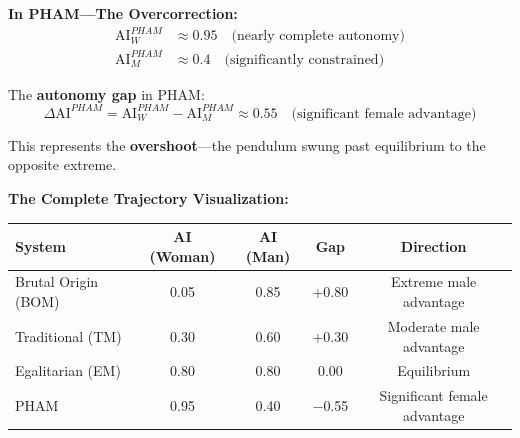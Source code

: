 \documentclass[12pt, letterpaper]{article}
\begin{document}
\textbf{In PHAM---The Overcorrection:}
\begin{align*}
\text{AI}_W^{PHAM} &\approx 0.95 \quad \text{(nearly complete autonomy)} \\
\text{AI}_M^{PHAM} &\approx 0.4 \quad \text{(significantly constrained)}
\end{align*}

The \textbf{autonomy gap} in PHAM:
\[
\Delta \text{AI}^{PHAM} = \text{AI}_W^{PHAM} - \text{AI}_M^{PHAM} \approx 0.55 \quad \text{(significant female advantage)}
\]

This represents the \textbf{overshoot}---the pendulum swung past equilibrium to the opposite extreme.

\textbf{The Complete Trajectory Visualization:}

\begin{center}
\begin{tabular}{|l|c|c|c|c|}
\hline
\textbf{System} & \textbf{AI (Woman)} & \textbf{AI (Man)} & \textbf{Gap} & \textbf{Direction} \\
\hline
Brutal Origin (BOM) & 0.05 & 0.85 & +0.80 & Extreme male advantage \\
\hline
Traditional (TM) & 0.30 & 0.60 & +0.30 & Moderate male advantage \\
\hline
Egalitarian (EM) & 0.80 & 0.80 & 0.00 & Equilibrium \\
\hline
PHAM & 0.95 & 0.40 & $-$0.55 & Significant female advantage \\
\hline
\end{tabular}
\end{center}
\end{document}
